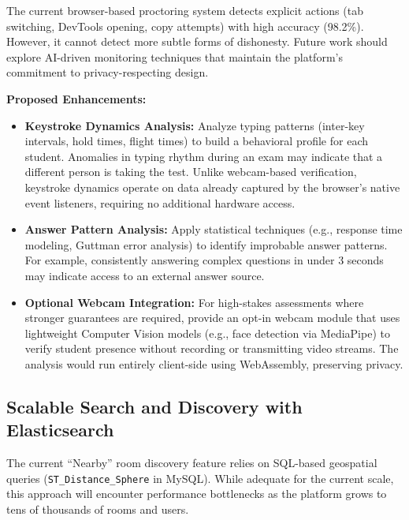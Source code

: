 The current browser-based proctoring system detects explicit actions (tab switching, DevTools opening, copy attempts) with high accuracy (98.2\%). However, it cannot detect more subtle forms of dishonesty. Future work should explore AI-driven monitoring techniques that maintain the platform's commitment to privacy-respecting design.

\textbf{Proposed Enhancements:}
\begin{itemize}
    \item \textbf{Keystroke Dynamics Analysis:} Analyze typing patterns (inter-key intervals, hold times, flight times) to build a behavioral profile for each student. Anomalies in typing rhythm during an exam may indicate that a different person is taking the test. Unlike webcam-based verification, keystroke dynamics operate on data already captured by the browser's native event listeners, requiring no additional hardware access.
    
    \item \textbf{Answer Pattern Analysis:} Apply statistical techniques (e.g., response time modeling, Guttman error analysis) to identify improbable answer patterns. For example, consistently answering complex questions in under 3 seconds may indicate access to an external answer source.
    
    \item \textbf{Optional Webcam Integration:} For high-stakes assessments where stronger guarantees are required, provide an opt-in webcam module that uses lightweight Computer Vision models (e.g., face detection via MediaPipe) to verify student presence without recording or transmitting video streams. The analysis would run entirely client-side using WebAssembly, preserving privacy.
\end{itemize}

\subsection{Scalable Search and Discovery with Elasticsearch}

The current ``Nearby'' room discovery feature relies on SQL-based geospatial queries (\texttt{ST\_Distance\_Sphere} in MySQL). While adequate for the current scale, this approach will encounter performance bottlenecks as the platform grows to tens of thousands of rooms and users.

